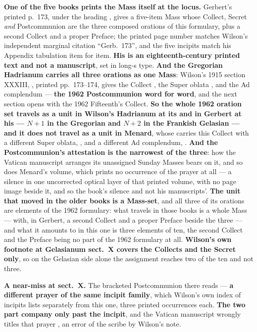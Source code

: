 \textbf{One of the five books prints the Mass itself at the locus.}
Gerbert's printed p.~173, under
the heading , gives a five-item Mass whose
Collect, Secret \emph{and} Postcommunion are the three composed orations of
this formulary, plus a second Collect and a proper Preface; the printed page
number matches Wilson's independent marginal citation ``Gerb.~173'', and the
five incipits match his Appendix tabulation item for item. \textbf{His is an
eighteenth-century printed text and not a manuscript}, set in long-s type.
\textbf{And the
Gregorian Hadrianum carries all three orations as one Mass}: Wilson's 1915
section XXXIII, , printed
pp.~173--174, gives the Collect , the Super
oblata , and the Ad complendum
 --- \textbf{the 1962 Postcommunion word for word},
and the next section opens with the 1962 Fifteenth's Collect. \textbf{So the
whole 1962 oration set travels as a unit in Wilson's Hadrianum at its
 and in Gerbert at his  --- $N{+}1$ in the
Gregorian and $N{+}2$ in the Frankish Gelasian --- and it does not travel as a
unit in Menard}, whose  carries this Collect with a
different Super oblata, , and a different
Ad complendum, . \textbf{And the
Postcommunion's attestation is the narrowest of the three}: how the Vatican
manuscript arranges its unassigned Sunday Masses bears on it, and so does
Menard's volume, which prints no occurrence of the prayer at all --- a silence
in one uncorrected optical layer of that printed volume, with no page image
beside it, and so the book's silence and not his manuscripts'. \textbf{The unit that moved in
the older books is a Mass-set}, and all three of its orations are elements of
the 1962 formulary: what travels in those books is a whole Mass --- with, in
Gerbert, a second Collect and a proper Preface beside the three --- and what it
amounts to in this one is three elements of ten, the second Collect and the
Preface being no part of the 1962 formulary at all. \textbf{Wilson's own
footnote at Gelasianum sect.~X covers the Collects and the Secret only}, so on
the Gelasian side alone the assignment reaches two of the ten and not three.

\textbf{A near-miss at sect.~X.} The bracketed
Postcommunion there reads  --- \textbf{a different
prayer of the same incipit family}, which Wilson's own index of incipits lists
separately from this one, three printed occurrences each. \textbf{The two part
company only past the incipit}, and the Vatican manuscript wrongly
titles that prayer , an error of the scribe by Wilson's note.

